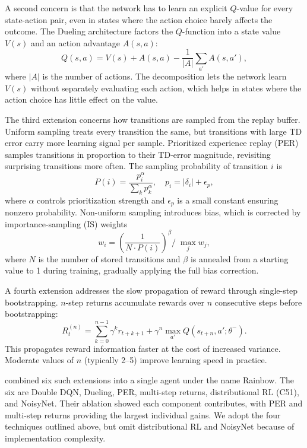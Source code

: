 \documentclass[12pt,a4paper,titlepage]{article}
\begin{document}
A second concern is that the network has to learn an explicit $Q$-value for every state-action pair, even in states where the action choice barely affects the outcome. The Dueling architecture \citep{Wang2016} factors the $Q$-function into a state value $V(s)$ and an action advantage $A(s, a)$:
\begin{equation}
Q(s, a) = V(s) + A(s, a) - \frac{1}{|A|}\sum_{a'} A(s, a'),
\end{equation}
where $|A|$ is the number of actions. The decomposition lets the network learn $V(s)$ without separately evaluating each action, which helps in states where the action choice has little effect on the value.

The third extension concerns how transitions are sampled from the replay buffer. Uniform sampling treats every transition the same, but transitions with large TD error carry more learning signal per sample. Prioritized experience replay (PER) \citep{Schaul2016} samples transitions in proportion to their TD-error magnitude, revisiting surprising transitions more often. The sampling probability of transition $i$ is
\begin{equation}
P(i) = \frac{p_i^\alpha}{\sum_k p_k^\alpha}, \quad p_i = |\delta_i| + \epsilon_p,
\end{equation}
where $\alpha$ controls prioritization strength and $\epsilon_p$ is a small constant ensuring nonzero probability. Non-uniform sampling introduces bias, which is corrected by importance-sampling (IS) weights
\begin{equation}
w_i = \left(\frac{1}{N \cdot P(i)}\right)^\beta\!\bigg/\; \max_j w_j,
\end{equation}
where $N$ is the number of stored transitions and $\beta$ is annealed from a starting value to 1 during training, gradually applying the full bias correction.

A fourth extension addresses the slow propagation of reward through single-step bootstrapping. $n$-step returns \citep{Sutton1988, SuttonBarto2018} accumulate rewards over $n$ consecutive steps before bootstrapping:
\begin{equation}
\label{eq:nstep}
R_t^{(n)} = \sum_{k=0}^{n-1} \gamma^k r_{t+k+1} + \gamma^n \max_{a'} Q(s_{t+n}, a'; \theta^-).
\end{equation}
This propagates reward information faster at the cost of increased variance. Moderate values of $n$ (typically 2--5) improve learning speed in practice.

\citet{Hessel2018} combined six such extensions into a single agent under the name Rainbow. The six are Double DQN, Dueling, PER, multi-step returns, distributional RL (C51), and NoisyNet. Their ablation showed each component contributes, with PER and multi-step returns providing the largest individual gains. We adopt the four techniques outlined above, but omit distributional RL and NoisyNet because of implementation complexity.
\end{document}
